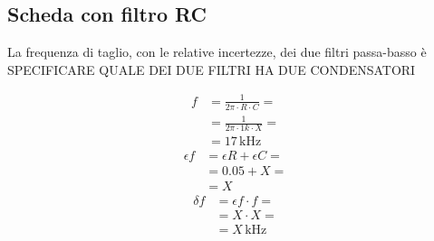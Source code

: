 \documentclass{article}
\begin{document}
		\subsection{Scheda con filtro RC}
			La frequenza di taglio, con le relative incertezze, dei due filtri passa-basso è
			SPECIFICARE QUALE DEI DUE FILTRI HA DUE CONDENSATORI
			\newline
			\begin{minipage}[t]{0.5\textwidth}
				\begin{equation*}
					\begin{split}
						f &= \frac{1}{2 \pi \cdot R \cdot C} = \\
						  &= \frac{1}{2 \pi \cdot 1k \cdot X} = \\
						  &= 17 \, \mathrm{kHz}
					\end{split}
				\end{equation*}
				\newline
				\begin{equation*}
					\begin{split}
						\epsilon f &= \epsilon R + \epsilon C = \\
								   &= 0.05 + X = \\
								   &= X
					\end{split}
				\end{equation*}
				\newline
				\begin{equation*}
					\begin{split}
						\delta f &= \epsilon f \cdot f = \\
								 &= X \cdot X = \\
								 &= X \, \mathrm{kHz}
					\end{split}
				\end{equation*}
			\end{minipage}
\end{document}
